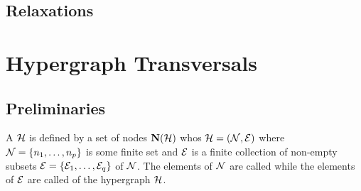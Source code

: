 \documentclass[aps, 10pt, english, twoside, twocolumn, pra, nofootinbib, tightenlines, longbibliography, superscriptaddress]{revtex4-1}
\begin{document}
    \subsection{Relaxations}

    \section{Hypergraph Transversals}
    \subsection{Preliminaries}
    \cite{Kavvadias_2005}
    \cite{Boros_2004}
    \cite{Boros_2002}
    \cite{Gainer_2017}
    \begin{definition}
        \label{def:hypergraph}
        A  $\mathcal{H}$ is defined by a set of nodes $\mathbf{N}\br{\s H}$ whos $\s H = \br{\nodes, \edges}$ where $\nodes = \bc{n_1, \ldots, n_p}$ is some finite set and $\mathcal{E}$ is a finite collection of non-empty subsets $\edges = \bc{\edges_{1}, \ldots, \edges_{q}}$ of $\mathcal{N}$. The elements of $\mathcal{N}$ are called  while the elements of $\mathcal{E}$ are called  of the hypergraph $\mathcal{H}$.
    \end{definition}
\end{document}
